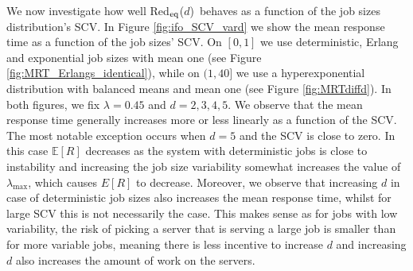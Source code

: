 \documentclass[12pt]{report}
\newcommand{\Redid}{Red$_{\textup{eq}}$($d$)}
\newcommand{\E}{\mathbb{E}}
\begin{document}
We now investigate how well \Redid\ behaves as a function of the job sizes distribution's SCV. In Figure \ref{fig:ifo_SCV_vard} we show the mean response time as a function of the job sizes' SCV. On $[0,1]$ we use deterministic, Erlang and exponential job sizes with mean one (see Figure \ref{fig:MRT_Erlangs_identical}), while on $(1,40]$ we use a hyperexponential distribution with balanced means and mean one (see Figure \ref{fig:MRTdiffd}). In both figures, we fix $\lambda=0.45$ and $d=2,3,4,5$. We observe that the mean response time generally increases more or less linearly 
as a function of the SCV.
The most notable exception occurs when $d=5$ and the SCV is close to zero. In this case 
$\E[R]$ decreases as the system with deterministic jobs is close to instability and increasing the job size variability somewhat increases the value of $\lambda_{\max}$, which causes $E[R]$ to decrease.  Moreover, we observe that increasing $d$ in case of deterministic job sizes also increases the mean response time, whilst for large SCV this is not necessarily the case. This makes sense as for jobs with low variability, the risk of picking a server that is serving a large job is smaller than for more variable jobs, meaning there is less incentive to increase $d$ and increasing $d$ also increases the amount of work on the servers. 
\end{document}
